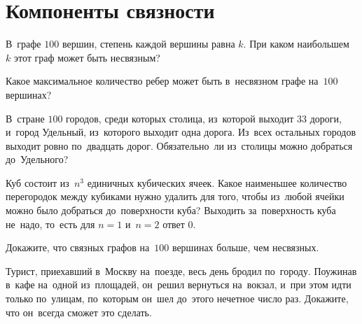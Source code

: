 
\section*{Компоненты связности}


\begin{problems}

\item
В~графе $100$ вершин, степень каждой вершины равна $k$.
При каком наибольшем~$k$ этот граф может быть несвязным?

\item
Какое максимальное количество ребер может быть в~несвязном графе на~$100$
вершинах?

\item
В~стране $100$ городов, среди которых столица, из~которой выходит $33$ дороги,
и~город Удельный, из~которого выходит одна дорога.
Из~всех остальных городов выходит ровно по~двадцать дорог.
Обязательно~ли из~столицы можно добраться до~Удельного?

\item
Куб состоит из~$n^3$ единичных кубических ячеек.
Какое наименьшее количество перегородок между кубиками нужно удалить для того,
чтобы из~любой ячейки можно было добраться до~поверхности куба?
Выходить за~поверхность куба не~надо, то~есть для $n = 1$ и~$n = 2$ ответ $0$.

\item
Докажите, что связных графов на~$100$ вершинах больше, чем несвязных.

\item
Турист, приехавший в~Москву на~поезде, весь день бродил по~городу.
Поужинав в~кафе на~одной из~площадей, он~решил вернуться на~вокзал, и~при этом
идти только по~улицам, по~которым он~шел до~этого нечетное число раз.
Докажите, что он~всегда сможет это сделать.

\end{problems}

